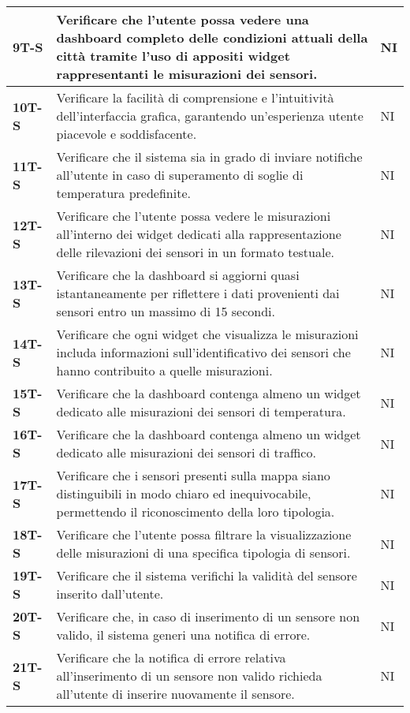 \begin{longtable}{|>{\raggedright\arraybackslash}m{}|>{\raggedright\arraybackslash}m{}|>{\raggedright\arraybackslash}m{}|}
	\hline
	\textbf{9T-S}   & Verificare che l'utente possa vedere una dashboard completo delle condizioni attuali della città tramite l'uso di appositi widget rappresentanti le misurazioni dei sensori. & NI\\
	\hline
	\textbf{10T-S}   & Verificare la facilità di comprensione e l'intuitività dell'interfaccia grafica, garantendo un'esperienza utente piacevole e soddisfacente. & NI\\
	\hline
	\textbf{11T-S}   & Verificare che il sistema sia in grado di inviare notifiche all'utente in caso di superamento di soglie di temperatura predefinite. & NI\\
	\hline
	\textbf{12T-S}   & Verificare che l’utente possa vedere le misurazioni all’interno dei widget dedicati alla rappresentazione delle rilevazioni dei sensori in un formato testuale. & NI\\
	\hline
	\textbf{13T-S}   & Verificare che la dashboard si aggiorni quasi istantaneamente per riflettere i dati provenienti dai sensori entro un massimo di 15 secondi. & NI\\
	\hline
	\textbf{14T-S}   & Verificare che ogni widget che visualizza le misurazioni includa informazioni sull’identificativo dei sensori che hanno contribuito a quelle misurazioni. & NI\\
	\hline
	\textbf{15T-S}   & Verificare che la dashboard contenga almeno un widget dedicato alle misurazioni dei sensori di temperatura. & NI\\
	\hline
	\textbf{16T-S}   & Verificare che la dashboard contenga almeno un widget dedicato alle misurazioni dei sensori di traffico. & NI\\
	\hline
	\textbf{17T-S}   & Verificare che i sensori presenti sulla mappa siano distinguibili in modo chiaro ed inequivocabile, permettendo il riconoscimento della loro tipologia. & NI\\
	\hline
	\textbf{18T-S}   & Verificare che l’utente possa filtrare la visualizzazione delle misurazioni di una specifica tipologia di sensori. & NI\\
	\hline
	\textbf{19T-S}   & Verificare che il sistema verifichi la validità del sensore inserito dall’utente. & NI\\
	\hline
	\textbf{20T-S}   & Verificare che, in caso di inserimento di un sensore non valido, il sistema generi una notifica di errore. & NI\\
	\hline
	\textbf{21T-S}   & Verificare che la notifica di errore relativa all’inserimento di un sensore non valido richieda all’utente di inserire nuovamente il sensore. & NI\\

\end{longtable}

